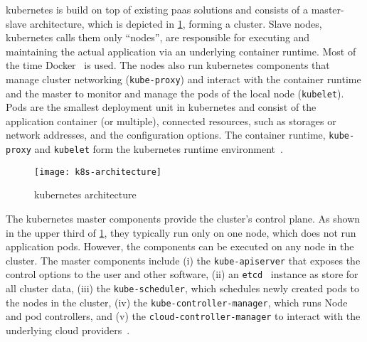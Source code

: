   \Gls{kubernetes} is build on top of existing \gls{paas} solutions and consists of a master-slave architecture, which is depicted in \cref{fig:kubernetes-architecture}, forming a cluster.
  Slave nodes, \gls{kubernetes} calls them only \enquote{nodes}, are responsible for executing and maintaining the actual application via an underlying container runtime.
  Most of the time Docker~\cite{docker} is used.
  The nodes also run \gls{kubernetes} components that manage cluster networking (\texttt{kube-proxy}) and interact with the container runtime and the master to monitor and manage the pods of the local node (\texttt{kubelet}).
  Pods are the smallest deployment unit in \gls{kubernetes} and consist of the application container (or multiple), connected resources, such as storages or network addresses, and the configuration options.
  The container runtime, \texttt{kube-proxy} and \texttt{kubelet} form the \gls{kubernetes} runtime environment~\cite{kubernetes}.

  \begin{figure}
    \centering
    \texttt{[image: k8s-architecture]}
    \caption{\Gls{kubernetes} architecture}
    \label{fig:kubernetes-architecture}
  \end{figure}

  The \gls{kubernetes} master components provide the cluster's control plane.
  As shown in the upper third of \cref{fig:kubernetes-architecture}, they typically run only on one node, which does not run application pods.
  However, the components can be executed on any node in the cluster.
  The master components include
  (i) the \texttt{kube-apiserver} that exposes the control options to the user and other software,
  (ii) an \texttt{etcd}~\cite{etcd} instance as store for all cluster data,
  (iii) the \texttt{kube-scheduler}, which schedules newly created pods to the nodes in the cluster,
  (iv) the \texttt{kube-controller-manager}, which runs Node and \glspl{pod controller}, and
  (v) the \texttt{cloud-controller-manager} to interact with the underlying cloud providers~\cite{kubernetes}.

